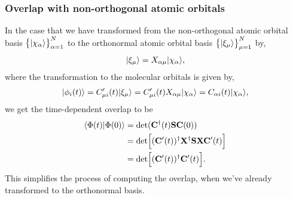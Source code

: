         \subsubsection{Overlap with non-orthogonal atomic orbitals}
            In the case that we have transformed from the non-orthogonal atomic
            orbital basis $\left\{ | \chi_{\alpha} \rangle \right\}_{\alpha = 1}^{N}$ to the
            orthonormal atomic orbital basis $\left\{ | \xi_{\mu} \rangle \right\}_{\mu =
            1}^{N}$ by,
            \begin{align}
                | \xi_{\mu} \rangle = X_{\alpha\mu}| \chi_{\alpha} \rangle,
            \end{align}
            where the transformation to the molecular orbitals is given by,
            \begin{align}
                | \phi_{i}(t) \rangle = C_{\mu i}'(t)| \xi_{\mu} \rangle
                = C_{\mu i}'(t)X_{\alpha\mu}| \chi_{\alpha} \rangle
                = C_{\alpha i}(t)| \chi_{\alpha} \rangle,
            \end{align}
            we get the time-dependent overlap to be
            \begin{align}
                \langle \Phi(t) | \Phi(0) \rangle
                &= \det(\mathbf{C}^{\dagger}(t)\mathbf{S}\mathbf{C}(0))
                \\
                &= \det\Bigl[
                    (\mathbf{C}'(t))^{\dagger} \mathbf{X}^{\dagger}
                    \mathbf{S}\mathbf{X}\mathbf{C}'(t)
                \Bigr]
                \\
                &=
                \det\Bigl[
                    (\mathbf{C}'(t))^{\dagger}
                    \mathbf{C}'(t)
                \Bigr].
            \end{align}
            This simplifies the process of computing the overlap, when we've
            already transformed to the orthonormal basis.

